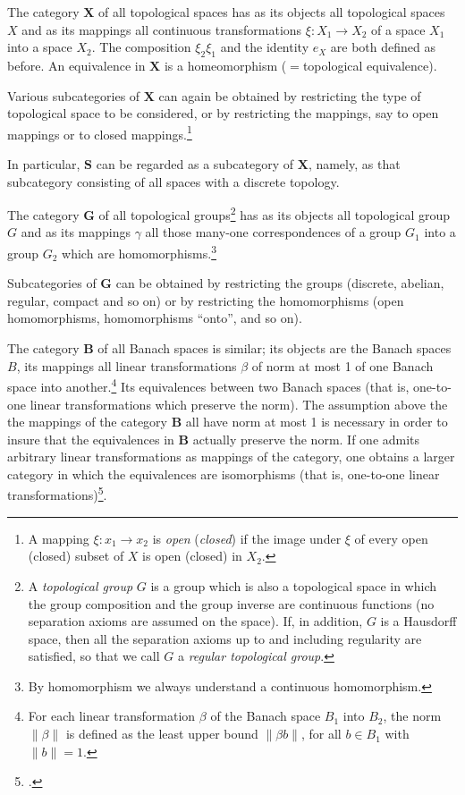 \documentclass[11pt,a4paper]{report}
\begin{document}
The category $\mathbf{X}$ of all topological spaces has as its objects all topological spaces $X$ and as its mappings all
continuous transformations $\xi: X_1\rightarrow X_2$ of a space $X_1$ into a space $X_2$. The composition $\xi_2\xi_1$ and
the identity $e_X$ are both defined as before. An equivalence in $\mathbf{X}$ is a homeomorphism ($=$topological equivalence).

Various subcategories of $\mathbf{X}$ can again be obtained by restricting the type of topological space to be considered,
or by restricting the mappings, say to open mappings or to closed mappings.\footnote{A mapping $\xi:x_1\rightarrow x_2$
is \emph{open} (\emph{closed}) if the image under $\xi$ of every open (closed) subset of $X$ is open (closed) in $X_2$.}

In particular,  $\mathbf{S}$ can be regarded as a subcategory of $\mathbf{X}$, namely, as that subcategory consisting of
all spaces with a discrete topology.

The category $\mathbf{G}$ of all topological groups\footnote{A \emph{topological group} $G$ is a group which is also a
topological space in which the group composition and the group inverse are continuous functions (no separation axioms
are assumed on the space). If, in addition, $G$ is a Hausdorff space, then all the separation axioms up to and including
regularity are satisfied, so that we call $G$ a \emph{regular topological group}.} has as its objects all topological
group $G$ and as its mappings $\gamma$ all those many\hyp{}one correspondences of a group $G_1$ into a group $G_2$ which are
homomorphisms.\footnote{By homomorphism we always understand a continuous homomorphism.}

Subcategories of $\mathbf{G}$ can be obtained by restricting the groups (discrete, abelian, regular, compact and so on)
or by restricting the homomorphisms (open homomorphisms, homomorphisms ``onto'', and so on).

The category $\mathbf{B}$ of all Banach spaces is similar; its objects are the Banach spaces $B$, its mappings all linear
transformations $\beta$ of norm at most 1 of one Banach space into another.\footnote{For each linear transformation $\beta$
of the Banach space $B_1$ into $B_2$, the norm $\|\beta\|$ is defined as the least upper bound $\|\beta b\|$, for all
$b\in B_1$ with $\|b\|=1$.} Its equivalences between two Banach spaces (that is, one\hyp{}to\hyp{}one linear transformations which
preserve the norm). The assumption above the the mappings of the category $\mathbf{B}$ all have norm at most 1 is 
necessary in order to insure that the equivalences in $\mathbf{B}$ actually preserve the norm. If one admits arbitrary
linear transformations as mappings of the category, one obtains a larger category in which the equivalences are isomorphisms
(that is, one\hyp{}to\hyp{}one linear transformations)\footcite[180]{banach32}.
\end{document}
